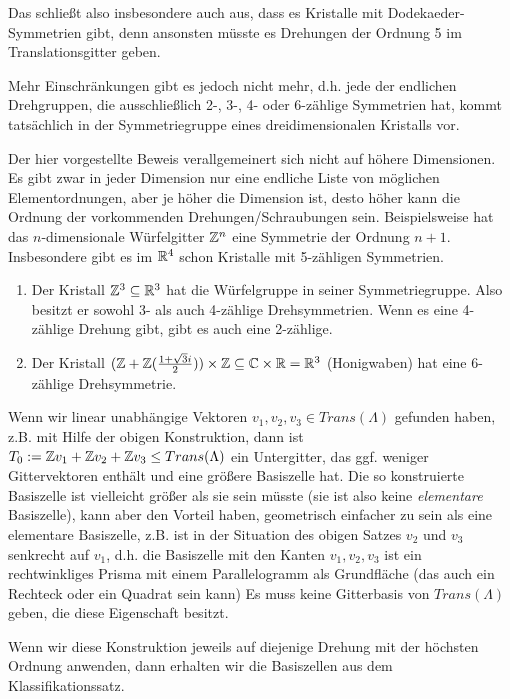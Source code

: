 \begin{remark}
Das schließt also insbesondere auch aus, dass es Kristalle mit Dodekaeder-Symmetrien gibt, denn ansonsten müsste es Drehungen der Ordnung 5 im Translationsgitter geben.

Mehr Einschränkungen gibt es jedoch nicht mehr, d.h. jede der endlichen Drehgruppen, die ausschließlich 2-, 3-, 4- oder 6-zählige Symmetrien hat, kommt tatsächlich in der Symmetriegruppe eines dreidimensionalen Kristalls vor.

Der hier vorgestellte Beweis verallgemeinert sich nicht auf höhere Dimensionen. Es gibt zwar in jeder Dimension nur eine endliche Liste von möglichen Elementordnungen, aber je höher die Dimension ist, desto höher kann die Ordnung der vorkommenden Drehungen/Schraubungen sein. Beispielsweise hat das $n$-dimensionale Würfelgitter $\mathbb{Z}^n$ eine Symmetrie der Ordnung $n+1$. Insbesondere gibt es im $\mathbb{R}^4$ schon Kristalle mit 5-zähligen Symmetrien.
\end{remark}

\begin{example}
\begin{enumerate}
\item Der Kristall $\mathbb{Z}^3\subseteq\mathbb{R}^3$ hat die Würfelgruppe in seiner Symmetriegruppe. Also besitzt er sowohl 3- als auch 4-zählige Drehsymmetrien. Wenn es eine 4-zählige Drehung gibt, gibt es auch eine 2-zählige.
\item Der Kristall $(\mathbb{Z}+\mathbb{Z}(\tfrac{1+\sqrt{3}i}{2})) \times \mathbb{Z} \subseteq \mathbb{C}\times\mathbb{R} = \mathbb{R}^3$ (Honigwaben) hat eine 6-zählige Drehsymmetrie.
\end{enumerate}
\end{example}

\begin{remark}
Wenn wir linear unabhängige Vektoren $v_1,v_2,v_3\in Trans(\Lambda)$ gefunden haben, z.B. mit Hilfe der obigen Konstruktion, dann ist $T_0:=\mathbb{Z} v_1+\mathbb{Z} v_2+\mathbb{Z} v_3 \leq Trans(\Lambda)$ ein Untergitter, das ggf. weniger Gittervektoren enthält und eine größere Basiszelle hat. Die so konstruierte Basiszelle ist vielleicht größer als sie sein müsste (sie ist also keine \emph{elementare} Basiszelle), kann aber den Vorteil haben, geometrisch einfacher zu sein als eine elementare Basiszelle, z.B. ist in der Situation des obigen Satzes $v_2$ und $v_3$ senkrecht auf $v_1$, d.h. die Basiszelle mit den Kanten $v_1,v_2,v_3$ ist ein rechtwinkliges Prisma mit einem Parallelogramm als Grundfläche (das auch ein Rechteck oder ein Quadrat sein kann) Es muss keine Gitterbasis von $Trans(\Lambda)$ geben, die diese Eigenschaft besitzt.

Wenn wir diese Konstruktion jeweils auf diejenige Drehung mit der höchsten Ordnung anwenden, dann erhalten wir die Basiszellen aus dem Klassifikationssatz.
\end{remark}

